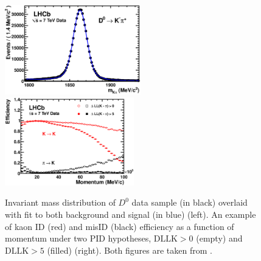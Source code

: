 \begin{figure}[!h]
	\centering
	\includegraphics[width = 0.525\textwidth]{figs/detector/D0_Mass.eps}%
	\includegraphics[width = 0.5\textwidth]{figs/detector/KandPi_2_K.eps}%
	\caption{Invariant mass distribution of $D^{0}$ data sample (in black) overlaid with fit to both background and signal (in blue) (left). An example of kaon \Gls{ID} (red) and \Gls{misID} (black) efficiency as a function of momentum under two PID hypotheses, $\textrm{DLL{K}} > 0$ (empty)  and $\textrm{DLL{K}} > 5$ (filled) (right). Both figures are taken from \cite{LHCb-DP-2012-003}.}
	\label{fig:richperf}
\end{figure}




